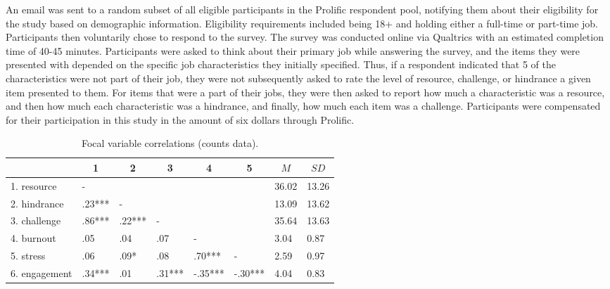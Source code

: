 \documentclass[
  man]{apa6}
\begin{document}
An email was sent to a random subset of all eligible participants in the Prolific respondent pool, notifying them about their eligibility for the study based on demographic information. Eligibility requirements included being 18+ and holding either a full-time or part-time job. Participants then voluntarily chose to respond to the survey. The survey was conducted online via Qualtrics with an estimated completion time of 40-45 minutes. Participants were asked to think about their primary job while answering the survey, and the items they were presented with depended on the specific job characteristics they initially specified. Thus, if a respondent indicated that 5 of the characteristics were not part of their job, they were not subsequently asked to rate the level of resource, challenge, or hindrance a given item presented to them. For items that were a part of their jobs, they were then asked to report how much a characteristic was a resource, and then how much each characteristic was a hindrance, and finally, how much each item was a challenge. Participants were compensated for their participation in this study in the amount of six dollars through Prolific.

\begin{table}[tbp]

\begin{center}
\begin{threeparttable}

\caption{\label{tab:correlation_table}Focal variable correlations (counts data).}

\begin{tabular}{llllllll}
\toprule
 & \multicolumn{1}{c}{1} & \multicolumn{1}{c}{2} & \multicolumn{1}{c}{3} & \multicolumn{1}{c}{4} & \multicolumn{1}{c}{5} & \multicolumn{1}{c}{$M$} & \multicolumn{1}{c}{$SD$}\\
\midrule
1. resource & - &  &  &  &  & 36.02 & 13.26\\
2. hindrance & .23*** & - &  &  &  & 13.09 & 13.62\\
3. challenge & .86*** & .22*** & - &  &  & 35.64 & 13.63\\
4. burnout & .05 & .04 & .07 & - &  & 3.04 & 0.87\\
5. stress & .06 & .09* & .08 & .70*** & - & 2.59 & 0.97\\
6. engagement & .34*** & .01 & .31*** & -.35*** & -.30*** & 4.04 & 0.83\\
\bottomrule
\end{tabular}

\end{threeparttable}
\end{center}

\end{table}
\end{document}

